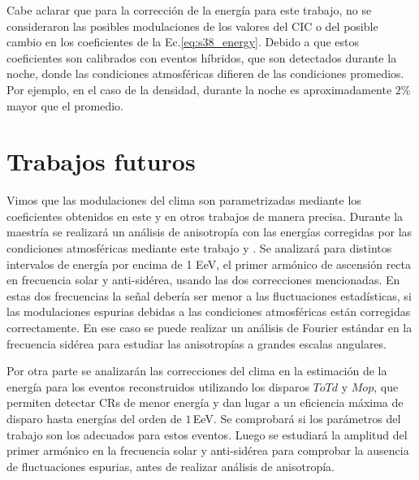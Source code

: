 Cabe aclarar que para la corrección de la energía para este trabajo, no se consideraron las posibles modulaciones de los valores del CIC o del posible cambio en los coeficientes de la Ec.\ref{eq:s38_energy}. Debido a que estos coeficientes son calibrados con eventos híbridos, que son detectados durante la noche, donde las condiciones atmosféricas difieren de las condiciones promedios. Por ejemplo, en el caso de la densidad, durante la noche es aproximadamente $2\%$ mayor que el promedio.


\section{Trabajos futuros}

Vimos que las modulaciones del clima son parametrizadas mediante los coeficientes obtenidos en este y en otros trabajos de manera precisa. Durante la maestría se realizará un análisis de anisotropía con las energías corregidas por las condiciones atmosféricas mediante este trabajo y \cite{aab2017impact}. 
Se analizará para distintos intervalos de energía por encima de 1 EeV, el primer armónico de ascensión recta en frecuencia solar y anti-sidérea, usando las  dos correcciones mencionadas. En estas dos frecuencias la señal debería ser menor a las fluctuaciones estadísticas, si las modulaciones espurias debidas a las condiciones atmosféricas están corregidas correctamente. En ese caso se puede realizar un análisis de Fourier estándar en la frecuencia sidérea para estudiar las anisotropías a grandes escalas angulares.



Por otra parte se analizarán las correcciones del clima en la estimación de la energía para los eventos reconstruidos  utilizando los disparos $ToTd$ y $Mop$,  que permiten detectar CRs de menor energía y dan lugar a un eficiencia máxima de disparo hasta  energías del orden de $1\,$EeV. Se comprobará si los parámetros del trabajo \cite{aab2017impact} son los adecuados  para estos eventos. Luego se estudiará la amplitud del primer armónico en la frecuencia solar y anti-sidérea para comprobar la ausencia de fluctuaciones espurias, antes de realizar análisis de anisotropía. 



